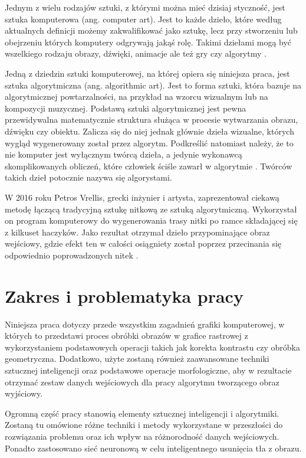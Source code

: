 \documentclass[a4paper, 12pt, polish, twoside]{extreport}
\begin{document}
    Jednym z wielu rodzajów sztuki, z którymi można mieć dzisiaj styczność, jest sztuka komputerowa (ang. computer art). Jest to każde dzieło, które według aktualnych definicji możemy zakwalifikować jako sztukę, lecz przy stworzeniu lub obejrzeniu których komputery odgrywają jakąś rolę. Takimi dziełami mogą być wszelkiego rodzaju obrazy, dźwięki, animacje ale też gry czy algorytmy \cite{computer-art}.
    
    Jedną z dziedzin sztuki komputerowej, na której opiera się niniejsza praca, jest sztuka algorytmiczna (ang. algorithmic art). Jest to forma sztuki, która bazuje na algorytmicznej powtarzalności, na przykład na wzorcu wizualnym lub na kompozycji muzycznej. Podstawą sztuki algorytmicznej jest pewna przewidywalna matematycznie struktura służąca w procesie wytwarzania obrazu, dźwięku czy obiektu.
    Zalicza się do niej jednak głównie dzieła wizualne, których wygląd wygenerowany został przez algorytm. Podkreślić natomiast należy, że to nie komputer jest wyłącznym twórcą dzieła, a jedynie wykonawcą skomplikowanych obliczeń, które człowiek ściśle zawarł w algorytmie \cite{selected-works}. Twórców takich dzieł potocznie nazywa się algorystami.
    
    W 2016 roku Petros Vrellis, grecki inżynier i artysta, zaprezentował ciekawą metodę łączącą tradycyjną sztukę nitkową ze sztuką algorytmiczną. Wykorzystał on program komputerowy do wygenerowania trasy nitki po ramce składającej się z kilkuset haczyków. Jako rezultat otrzymał dzieło przypominające obraz wejściowy, gdzie efekt ten w całości osiągniety został poprzez przecinania się odpowiednio poprowadzonych nitek \cite{new-way-to-knit}.
    
    \section{Zakres i problematyka pracy} \label{intro-scope}
    Niniejsza praca dotyczy przede wszystkim zagadnień grafiki komputerowej, w których to przedstawi proces obróbki obrazów w grafice rastrowej z wykorzystaniem podstawowych operacji takich jak korekta kontrastu czy obróbka geometryczna. Dodatkowo, użyte zostaną również zaawansowane techniki sztucznej inteligencji oraz podstawowe operacje morfologiczne, aby w rezultacie otrzymać zestaw danych wejściowych dla pracy algorytmu tworzącego obraz wyjściowy.
    
    Ogromną część pracy stanowią elementy sztucznej inteligencji i algorytmiki. Zostaną tu omówione różne techniki i metody wykorzystane w przeszłości do rozwiązania problemu oraz ich wpływ na różnorodność danych wejściowych. Ponadto zastosowano sieć neuronową w celu inteligentnego usunięcia tła z obrazu.
    
\end{document}
